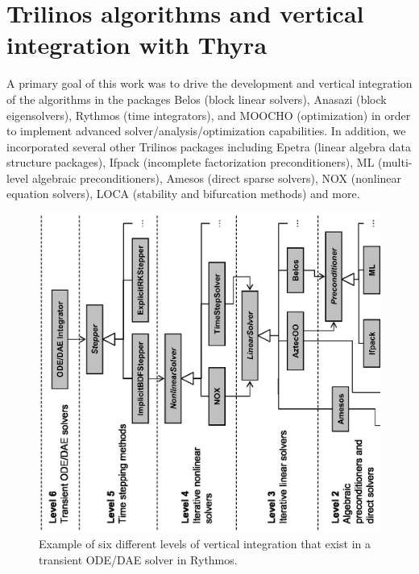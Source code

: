 \documentclass[pdf,ps2pdf,11pt]{SANDreport}
\begin{document}
%
\section{Trilinos algorithms and vertical integration with Thyra}
%

A primary goal of this work was to drive the development and vertical
integration of the algorithms in the packages Belos (block linear solvers),
Anasazi (block eigensolvers), Rythmos (time integrators), and MOOCHO
(optimization) in order to implement advanced solver/analysis/optimization
capabilities.  In addition, we incorporated several other Trilinos packages
including Epetra (linear algebra data structure packages), Ifpack (incomplete
factorization preconditioners), ML (multi-level algebraic preconditioners),
Amesos (direct sparse solvers), NOX (nonlinear equation solvers), LOCA
(stability and bifurcation methods) and more.

{\bsinglespace
\begin{figure}[p]
\begin{center}
\includegraphics*[angle=270,scale=0.90
]{VerticalPackageIntegration}
\end{center}
\caption{
\label{fig:VerticalPackageIntegration}
Example of six different levels of vertical integration that exist in a
transient ODE/DAE solver in Rythmos.  }
\end{figure}
\esinglespace}
\end{document}

